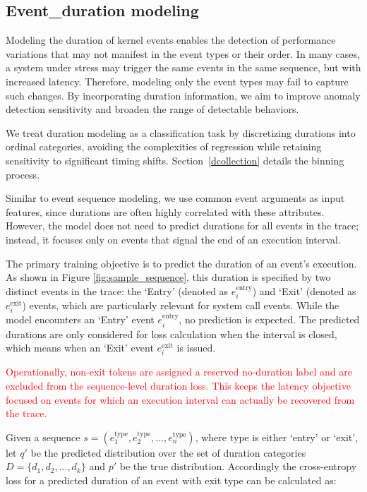 \documentclass[preprint,12pt]{elsarticle}
\begin{document}
\subsection{{Event\_duration} modeling}
Modeling the duration of kernel events enables the detection of performance variations that may not manifest in the event types or their order. In many cases, a system under stress may trigger the same events in the same sequence, but with increased latency. Therefore, modeling only the event types may fail to capture such changes. By incorporating duration information, we aim to improve anomaly detection sensitivity and broaden the range of detectable behaviors.

We treat duration modeling as a classification task by discretizing durations into ordinal categories, avoiding the complexities of regression while retaining sensitivity to significant timing shifts. Section~\ref{dcollection} details the binning process.

Similar to event sequence modeling, we use common event arguments as input features, since durations are often highly correlated with these attributes. However, the model does not need to predict durations for all events in the trace; instead, it focuses only on events that signal the end of an execution interval.

The primary training objective is to predict the duration of an event's execution. As shown in Figure \ref{fig:sample_sequence}, this duration is specified by two distinct events in the trace: the `Entry' (denoted as \( e_i^{\text{entry}} \)) and `Exit' (denoted as \( e_i^{\text{exit}} \)) events, which are particularly relevant for system call events. While the model encounters an `Entry' event \( e_i^{\text{entry}} \), no prediction is expected. The predicted durations are only considered for loss calculation when the interval is closed, which means when an `Exit' event \( e_i^{\text{exit}} \) is issued.

\textcolor{red}{Operationally, non-exit tokens are assigned a reserved no-duration label and are excluded from the sequence-level duration loss. This keeps the latency objective focused on events for which an execution interval can actually be recovered from the trace.}

Given a sequence \( s = (e_1^{\text{type}}, e_2^{\text{type}}, \ldots, e_n^{\text{type}}) \), where \( \text{type} \) is either `entry' or `exit', let \( q' \) be the predicted distribution over the set of duration categories $D = \{d_1, d_2, ..., d_k\}$ and \( p' \) be the true distribution. Accordingly the cross-entropy loss for a predicted duration of an event with exit type can be calculated as:
\end{document}
